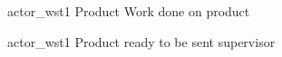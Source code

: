 \documentclass{article}
\begin{document}
\begin{landscape}
\begin{center}
\begin{sequencediagram}
\begin{messcall}
			\begin{callself}
				{actor_wst1}
				{
					Product
				}
				{
					Work done on product
				}
			\end{callself}

			\postlevel
			\postlevel
			\begin{messcall}
			{actor_wst1}
			{Product ready to be sent}
			{supervisor}

			\end{messcall}
		\end{messcall}

	\end{sequencediagram}
\end{center}
\end{landscape}
\end{document}

